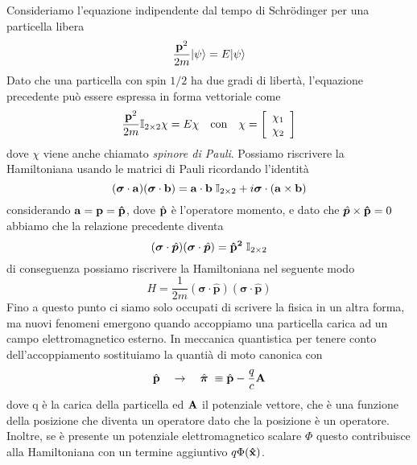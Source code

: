 Consideriamo l'equazione indipendente dal tempo di Schr\"odinger per una particella libera
\begin{equation*}
	\frac{\bold{p}^2}{2m}|\psi \rangle = E|\psi \rangle
\end{equation*}
Dato che una particella con spin $1/2$ ha due gradi di libert\`a, l'equazione precedente pu\`o essere espressa in forma vettoriale come
\begin{equation*}
	\frac{\bold{p}^2}{2m} \mathbb{I}_{2 \times 2} \chi = E \chi \quad \text{con} \quad \chi = \left [\begin{array}{c}
		\chi_1 \\ \chi_2
	\end{array}\right]
\end{equation*}
dove $\chi$ viene anche chiamato \textit{spinore di Pauli}. Possiamo riscrivere la Hamiltoniana usando le matrici di Pauli ricordando l'identit\`a
\begin{equation*}
	(\boldsymbol{\sigma} \cdot \bold{a})(\boldsymbol{\sigma} \cdot \bold{b}) = \bold{a} \cdot \bold{b} \; \mathbb{I}_{2 \times 2} + i \boldsymbol{\sigma} \cdot (\bold{a} \times \bold{b})
\end{equation*}
considerando $\bold{a} = \bold{p} = \bold{\hat{p}}$, dove $\hat{\bold{p}}$ \`e l'operatore momento, e dato che $\hat{\boldsymbol{p}} \times \bold{\hat{p}} = 0$ abbiamo che la relazione precedente diventa
\begin{equation*}
	(\boldsymbol{\sigma} \cdot \hat{\boldsymbol{p}})(\boldsymbol{\sigma} \cdot \hat{\boldsymbol{p}}) = \bold{\hat{p}^2} \;\mathbb{I}_{2 \times 2}
\end{equation*}
di conseguenza possiamo riscrivere la Hamiltoniana nel seguente modo
\begin{equation}
	H = \frac{1}{2m} (\boldsymbol{\sigma} \cdot \hat{\boldsymbol{p}})(\boldsymbol{\sigma} \cdot \hat{\boldsymbol{p}})
\end{equation}
Fino a questo punto ci siamo solo occupati di scrivere la fisica in un altra forma, ma nuovi fenomeni emergono quando accoppiamo una particella carica ad un campo elettromagnetico esterno. In meccanica quantistica per tenere conto dell'accoppiamento sostituiamo la quanti\`a di moto canonica con 
\begin{equation*}
	 \hat{\bold{p}} \quad \rightarrow \quad \hat{\boldsymbol{\pi}} \;  \equiv \hat{\bold{p}} - \frac{q}{c} \bold{A}
\end{equation*}
dove q \`e la carica della particella ed $\bold{A}$ il potenziale vettore, che \`e una funzione della posizione che diventa un operatore dato che la posizione \`e un operatore. Inoltre, se \`e presente un potenziale elettromagnetico scalare $\Phi$ questo contribuisce alla Hamiltoniana con un termine aggiuntivo $q \Phi(\bold{\hat{x}})$. 

